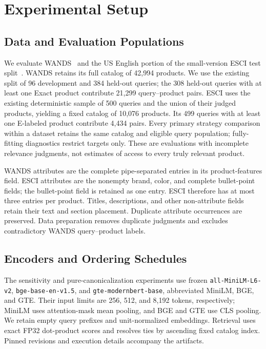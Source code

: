 \section{Experimental Setup}
\label{sec:experimental_setup}

\subsection{Data and Evaluation Populations}
\label{sec:evaluation_populations}

We evaluate WANDS~\cite{chen2022wands} and the US English portion of the small-version ESCI test split~\cite{reddy2022shopping}. WANDS retains its full catalog of 42,994 products. We use the existing split of 96 development and 384 held-out queries; the 308 held-out queries with at least one Exact product contribute 21,299 query--product pairs. ESCI uses the existing deterministic sample of 500 queries and the union of their judged products, yielding a fixed catalog of 10,076 products. Its 499 queries with at least one E-labeled product contribute 4,434 pairs. Every primary strategy comparison within a dataset retains the same catalog and eligible query population; fully-fitting diagnostics restrict targets only. These are evaluations with incomplete relevance judgments, not estimates of access to every truly relevant product.

WANDS attributes are the complete pipe-separated entries in its product-features field. ESCI attributes are the nonempty brand, color, and complete bullet-point fields; the bullet-point field is retained as one entry. ESCI therefore has at most three entries per product. Titles, descriptions, and other non-attribute fields retain their text and section placement. Duplicate attribute occurrences are preserved. Data preparation removes duplicate judgments and excludes contradictory WANDS query--product labels.

\subsection{Encoders and Ordering Schedules}
\label{sec:encoders_schedules}

The sensitivity and pure-canonicalization experiments use frozen \texttt{all-\allowbreak MiniLM-\allowbreak L6-\allowbreak v2}, \texttt{bge-\allowbreak base-\allowbreak en-\allowbreak v1.5}, and \texttt{gte-\allowbreak modernbert-\allowbreak base}, abbreviated MiniLM, BGE, and GTE. Their input limits are 256, 512, and 8,192 tokens, respectively; MiniLM uses attention-mask mean pooling, and BGE and GTE use CLS pooling. We retain empty query prefixes and unit-normalized embeddings. Retrieval uses exact FP32 dot-product scores and resolves ties by ascending fixed catalog index. Pinned revisions and execution details accompany the artifacts.

